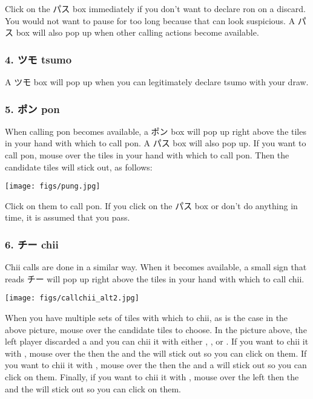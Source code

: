 Click on the パス box immediately if you don't want to declare {\jap ron} on a discard. You would not want to pause for too long because that can look suspicious. A パス box will also pop up when other calling actions become available. 

\subsubsection{4. ツモ {\jap tsumo} \textipa{[ts\'umo]}}
A ツモ box will pop up when you can legitimately declare {\jap tsumo} with your draw. 

\subsubsection{5. ポン {\jap pon} \textipa{[p\'\textopeno\ng]}}
When calling {\jap pon} becomes available, a ポン box will pop up right above the tiles in your hand with which to call {\jap pon}. A パス box will also pop up. If you want to call {\jap pon}, mouse over the tiles in your hand with which to call {\jap pon}. Then the candidate tiles will stick out, as follows:
\begin{center}
\vspace{2mm}
\texttt{[image: figs/pung.jpg]}
\end{center}

Click on them to call {\jap pon}. If you click on the パス box or don't do anything in time, it is assumed that you pass. 

\subsubsection{6. チー {\jap chii} }
{\jap Chii} calls are done in a similar way. When it becomes available, a small sign that reads チー will pop up right above the tiles in your hand with which to call {\jap chii}. 

\begin{center}
\vspace{2mm}
\texttt{[image: figs/callchii\_alt2.jpg]}
\end{center}

When you have multiple sets of tiles with which to {\jap chii}, as is the case in the above picture, mouse over the candidate tiles to choose. In the picture above, the left player discarded a {\LARGE {}} and you can {\jap chii} it with either {\LARGE {}}, {\LARGE {}}, or {\LARGE {}}. If you want to {\jap chii} it with {\LARGE {}}, mouse over the {\LARGE{}} then the {\LARGE {}} and the {\LARGE {}} will stick out so you can click on them. If you want to {\jap chii} it with {\LARGE {}}, mouse over the {\LARGE{}} then the {\LARGE {}} and a {\LARGE {}} will stick out so you can click on them. Finally, if you want to {\jap chii} it with {\LARGE {}}, mouse over the left {\LARGE {}} then the {\LARGE {}} and the {\LARGE {}} will stick out so you can click on them. 


